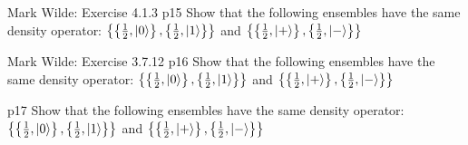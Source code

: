 \documentclass[a4paper, 11pt]{article}
\begin{document}

\begin{problem}{%
		Mark Wilde: Exercise 4.1.3
	}{p15%
	}
	Show that the following ensembles have the same density operator: $\left\{\left\{\frac12,\ket{0}\right\},\left\{\frac12,\ket{1}\right\}\right\}$ and $\left\{\left\{\frac12,\ket{+}\right\},\left\{\frac12,\ket{-}\right\}\right\}$
\end{problem}


\begin{problem}{%
		Mark Wilde: Exercise 3.7.12
	}{p16%
	}
	Show that the following ensembles have the same density operator: $\left\{\left\{\frac12,\ket{0}\right\},\left\{\frac12,\ket{1}\right\}\right\}$ and $\left\{\left\{\frac12,\ket{+}\right\},\left\{\frac12,\ket{-}\right\}\right\}$
\end{problem}


\begin{problem}{%
	}{p17%
	}
	Show that the following ensembles have the same density operator: $\left\{\left\{\frac12,\ket{0}\right\},\left\{\frac12,\ket{1}\right\}\right\}$ and $\left\{\left\{\frac12,\ket{+}\right\},\left\{\frac12,\ket{-}\right\}\right\}$
\end{problem}

\end{document}
